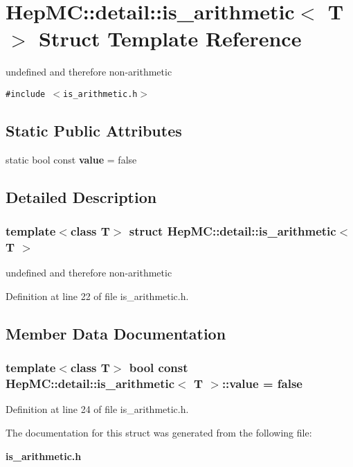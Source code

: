 \section{Hep\-MC::detail::is\_\-arithmetic$<$ T $>$ Struct Template Reference}
\label{structHepMC_1_1detail_1_1is__arithmetic}
undefined and therefore non-arithmetic  


{\tt \#include $<$is\_\-arithmetic.h$>$}

\subsection*{Static Public Attributes}
\begin{CompactItemize}
\item 
static bool const {\bf value} = false
\end{CompactItemize}


\subsection{Detailed Description}
\subsubsection*{template$<$class T$>$ struct Hep\-MC::detail::is\_\-arithmetic$<$ T $>$}

undefined and therefore non-arithmetic 



Definition at line 22 of file is\_\-arithmetic.h.

\subsection{Member Data Documentation}
\subsubsection{\setlength{\rightskip}{0pt plus 5cm}template$<$class T$>$ bool const {\bf Hep\-MC::detail::is\_\-arithmetic}$<$ T $>$::{\bf value} = false\hspace{0.3cm}{\tt  [static]}}\label{structHepMC_1_1detail_1_1is__arithmetic_10629487031fd5e2212737df84dafe56}




Definition at line 24 of file is\_\-arithmetic.h.

The documentation for this struct was generated from the following file:\begin{CompactItemize}
\item 
{\bf is\_\-arithmetic.h}\end{CompactItemize}
